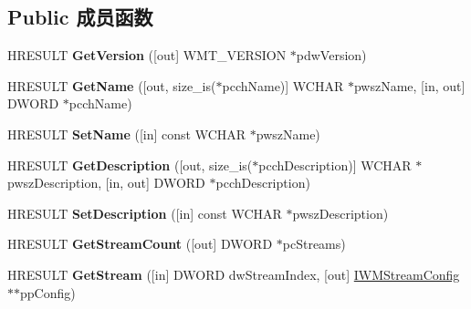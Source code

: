 \subsection*{Public 成员函数}
\begin{DoxyCompactItemize}
\item 
\mbox{\label{interface_i_w_m_profile_a48bba4218a9f44cb690ce2c3471d584e}} 
H\+R\+E\+S\+U\+LT {\bfseries Get\+Version} (\mbox{[}out\mbox{]} W\+M\+T\+\_\+\+V\+E\+R\+S\+I\+ON $\ast$pdw\+Version)
\item 
\mbox{\label{interface_i_w_m_profile_a863c4a0e236070969a19ecdd07bb08e7}} 
H\+R\+E\+S\+U\+LT {\bfseries Get\+Name} (\mbox{[}out, size\+\_\+is($\ast$pcch\+Name)\mbox{]} W\+C\+H\+AR $\ast$pwsz\+Name, \mbox{[}in, out\mbox{]} D\+W\+O\+RD $\ast$pcch\+Name)
\item 
\mbox{\label{interface_i_w_m_profile_aebbc67c90453199f98eddc121adafb7e}} 
H\+R\+E\+S\+U\+LT {\bfseries Set\+Name} (\mbox{[}in\mbox{]} const W\+C\+H\+AR $\ast$pwsz\+Name)
\item 
\mbox{\label{interface_i_w_m_profile_a6fe0ed870bb1dc55ba25f205b20d71ed}} 
H\+R\+E\+S\+U\+LT {\bfseries Get\+Description} (\mbox{[}out, size\+\_\+is($\ast$pcch\+Description)\mbox{]} W\+C\+H\+AR $\ast$pwsz\+Description, \mbox{[}in, out\mbox{]} D\+W\+O\+RD $\ast$pcch\+Description)
\item 
\mbox{\label{interface_i_w_m_profile_a1e4a6fd8be9f2467f574a7cfca2d1b10}} 
H\+R\+E\+S\+U\+LT {\bfseries Set\+Description} (\mbox{[}in\mbox{]} const W\+C\+H\+AR $\ast$pwsz\+Description)
\item 
\mbox{\label{interface_i_w_m_profile_ad29d0d37bf730653201b6cffdf33a1dc}} 
H\+R\+E\+S\+U\+LT {\bfseries Get\+Stream\+Count} (\mbox{[}out\mbox{]} D\+W\+O\+RD $\ast$pc\+Streams)
\item 
\mbox{\label{interface_i_w_m_profile_a5ba48861fc38dcddb434b8a6b81945a2}} 
H\+R\+E\+S\+U\+LT {\bfseries Get\+Stream} (\mbox{[}in\mbox{]} D\+W\+O\+RD dw\+Stream\+Index, \mbox{[}out\mbox{]} \hyperlink{interface_i_w_m_stream_config}{I\+W\+M\+Stream\+Config} $\ast$$\ast$pp\+Config)
$$
\end{DoxyCompactItemize}
